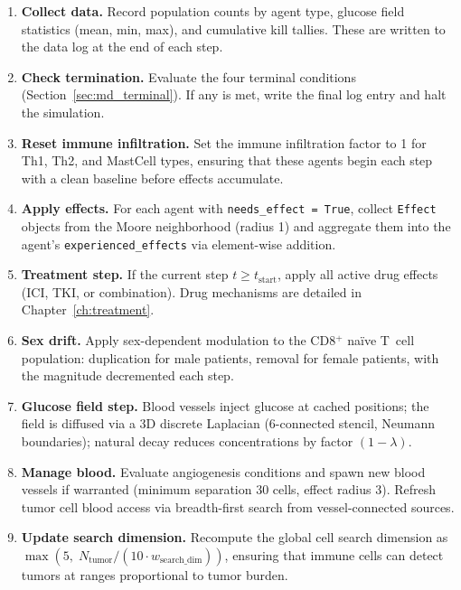\begin{enumerate}
    \item \textbf{Collect data.}  Record population counts by agent type, glucose field statistics (mean, min, max), and cumulative kill tallies.  These are written to the data log at the end of each step.

    \item \textbf{Check termination.}  Evaluate the four terminal conditions (Section~\ref{sec:md_terminal}).  If any is met, write the final log entry and halt the simulation.

    \item \textbf{Reset immune infiltration.}  Set the immune infiltration factor to 1 for Th1, Th2, and MastCell types, ensuring that these agents begin each step with a clean baseline before effects accumulate.

    \item \textbf{Apply effects.}  For each agent with \texttt{needs\_effect = True}, collect \texttt{Effect} objects from the Moore neighborhood (radius 1) and aggregate them into the agent's \texttt{experienced\_effects} via element-wise addition.

    \item \textbf{Treatment step.}  If the current step $t \geq t_{\text{start}}$, apply all active drug effects (ICI, TKI, or combination).  Drug mechanisms are detailed in Chapter~\ref{ch:treatment}.

    \item \textbf{Sex drift.}  Apply sex-dependent modulation to the CD8$^+$ na\"ive T~cell population: duplication for male patients, removal for female patients, with the magnitude decremented each step.

    \item \textbf{Glucose field step.}  Blood vessels inject glucose at cached positions; the field is diffused via a 3D discrete Laplacian ($6$-connected stencil, Neumann boundaries); natural decay reduces concentrations by factor $(1 - \lambda)$.

    \item \textbf{Manage blood.}  Evaluate angiogenesis conditions and spawn new blood vessels if warranted (minimum separation 30 cells, effect radius 3).  Refresh tumor cell blood access via breadth-first search from vessel-connected sources.

    \item \textbf{Update search dimension.}  Recompute the global cell search dimension as $\max(5,\; N_{\text{tumor}} / (10 \cdot w_{\text{search\_dim}}))$, ensuring that immune cells can detect tumors at ranges proportional to tumor burden.


\end{enumerate}
